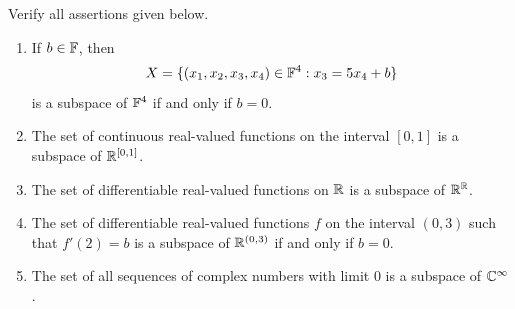 \begin{exercise}
Verify all assertions given below.
\begin{enumerate}
\item[(a)] If $b \in \mathbb{F}$, then
\[
X = \{(x_1, x_2, x_3, x_4) \in \mathbb{F}^4 : x_3 = 5x_4 + b\}
\]
is a subspace of $\mathbb{F}^4$ if and only if $b = 0$.
\item[(b)] The set of continuous real-valued functions on the interval $[0, 1]$ is a subspace of $\mathbb{R}^{[0,1]}$.
\item[(c)] The set of differentiable real-valued functions on $\mathbb{R}$ is a subspace of $\mathbb{R}^{\mathbb{R}}$.
\item[(d)] The set of differentiable real-valued functions $f$ on the interval $(0, 3)$ such that $f'(2) = b$ is a subspace of $\mathbb{R}^{(0,3)}$ if and only if $b = 0$.
\item[(e)] The set of all sequences of complex numbers with limit $0$ is a subspace of $\mathbb{C}^{\infty}$.
\end{enumerate}
\end{exercise}

